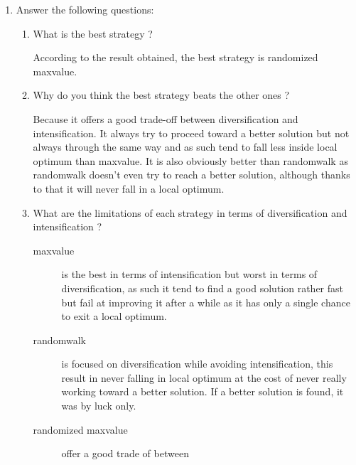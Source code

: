\begin{enumerate}
    \item Answer the following questions:
    	\begin{enumerate}
    		\item What is the best strategy ?
    			\begin{framed}
    				According to the result obtained, the best strategy is randomized maxvalue.
    			\end{framed}
    		\item Why do you think the best strategy beats the other ones ?
    			\begin{framed}
    				Because it offers a good trade-off between diversification
                    and intensification. It always try to proceed toward a
                    better solution but not always through the same way and
                    as such tend to fall less inside local optimum than
                    maxvalue. It is also obviously better than randomwalk as
                    randomwalk doesn't even try to reach a better solution,
                    although thanks to that it will never fall in a local
                    optimum.
    			\end{framed}
    		\item What are the limitations of each strategy in terms of
            diversification and intensification ?
    			\begin{framed}
                    \begin{description}
                        \item[maxvalue] is the best in terms of intensification
                        but worst in terms of diversification, as such it tend to
                        find a good solution rather fast but fail at improving it
                        after a while as it has only a single chance to exit a
                        local optimum. \newline \newline
                        \item[randomwalk] is focused on diversification while
                        avoiding intensification, this result in never falling in
                        local optimum at the cost of never really working toward
                        a better solution. If a better solution is found, it was
                        by luck only.\newline \newline
                        \item[randomized maxvalue] offer a good trade of between

\end{description}
\end{framed}
\end{enumerate}
\end{enumerate}
